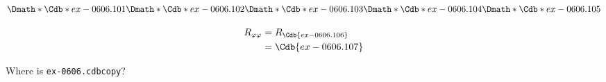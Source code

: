 \documentclass[12pt]{cdblatex}
\begin{document}
\clearpage

\begin{dgroup*}
   \Dmath*{\Cdb*{ex-0606.101}}
   \Dmath*{\Cdb*{ex-0606.102}}
   \Dmath*{\Cdb*{ex-0606.103}}
   \Dmath*{\Cdb*{ex-0606.104}}
   \Dmath*{\Cdb*{ex-0606.105}}
\end{dgroup*}

\begin{align*}
   R_{\varphi\varphi} &= R_{\Cdb{ex-0606.106}}\\
                      &= \Cdb{ex-0606.107}
\end{align*}

\bgroup
{}%
{}%
{Where is {\tt ex-0606.cdbcopy}?}
\egroup
\end{document}
